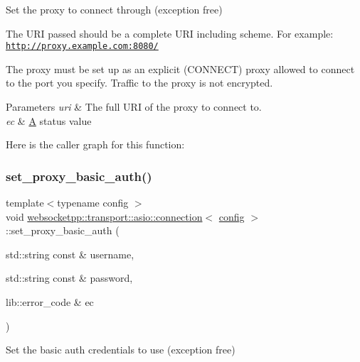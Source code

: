 Set the proxy to connect through (exception free) 

The U\+RI passed should be a complete U\+RI including scheme. For example\+: \href{http://proxy.example.com:8080/}{\tt http\+://proxy.\+example.\+com\+:8080/}

The proxy must be set up as an explicit (C\+O\+N\+N\+E\+CT) proxy allowed to connect to the port you specify. Traffic to the proxy is not encrypted.


\begin{DoxyParams}{Parameters}
{\em uri} & The full U\+RI of the proxy to connect to.\\
\hline
{\em ec} & \mbox{\hyperlink{struct_a}{A}} status value \\
\hline
\end{DoxyParams}
Here is the caller graph for this function\+:
\mbox{\label{classwebsocketpp_1_1transport_1_1asio_1_1connection_a99ee9d4f4043a2e3b2225cb1f03a56d1}} 
\subsubsection{\texorpdfstring{set\+\_\+proxy\+\_\+basic\+\_\+auth()}{set\_proxy\_basic\_auth()}}
{\footnotesize\ttfamily template$<$typename config $>$ \\
void \mbox{\hyperlink{classwebsocketpp_1_1transport_1_1asio_1_1connection}{websocketpp\+::transport\+::asio\+::connection}}$<$ \mbox{\hyperlink{classconfig}{config}} $>$\+::set\+\_\+proxy\+\_\+basic\+\_\+auth (\begin{DoxyParamCaption}\item[{std\+::string const \&}]{username,  }\item[{std\+::string const \&}]{password,  }\item[{lib\+::error\+\_\+code \&}]{ec }\end{DoxyParamCaption})\hspace{0.3cm}{\ttfamily [inline]}}



Set the basic auth credentials to use (exception free) 

